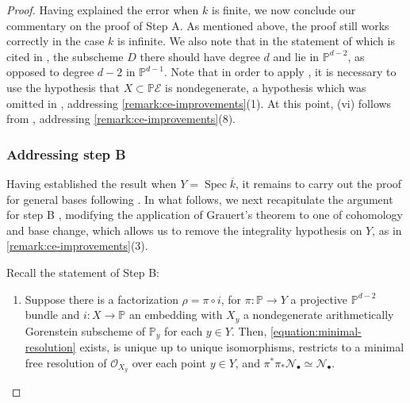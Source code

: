 \documentclass[12 pt]{amsart}
\theoremstyle{plain}
\theoremstyle{definition}
\theoremstyle{remark}
\numberwithin{equation}{section}
\newcommand\bp{\mathbb P}
\newcommand\sce{\mathscr E}
\newcommand\scn{\mathscr N}
\newcommand\sco{\mathscr O}
\newcommand \ra{\rightarrow}
\DeclareMathOperator\spec{\operatorname{Spec}}
\begin{document}
\begin{proof}
	Having explained the error when $k$ is finite, we now conclude our
	commentary on the proof of Step A.
	As mentioned above, the proof still works correctly in the case $k$ is
	infinite.
	We also note
	that in the statement of \cite[Lem., p. 119]{schreyer1986syzygies} which
	is cited in \cite[Step A, p. 443]{casnatiE:covers-algebraic-varieties},
	the subscheme $D$ there should have degree $d$ and lie in $\bp^{d-2}$,
	as opposed to degree $d-2$ in $\bp^{d-1}$.  
	Note that in order to apply \cite[Lem., p. 119]{schreyer1986syzygies},
	it is necessary to use the
	hypothesis that $X \subset \bp\sce$ is nondegenerate, a hypothesis
	which was omitted in \cite[Thm.\
	2.1]{casnatiE:covers-algebraic-varieties}, addressing
	\autoref{remark:ce-improvements}(1).
	At this point, (vi) follows from 
	\cite[Lem., p. 119]{schreyer1986syzygies}, addressing
	\autoref{remark:ce-improvements}(8).


\subsubsection*{Addressing step B}
	Having established the result when $Y = \spec \overline{k}$, 
	it remains to carry out the proof for general bases following \cite[Step B, C,
	and D, p. 445-447]{casnatiE:covers-algebraic-varieties}.
	In what follows, we next recapitulate the argument for step B \cite[p.
	445]{casnatiE:covers-algebraic-varieties}, modifying the application of
	Grauert's theorem to one of cohomology and base change, which allows us
	to remove the integrality hypothesis on $Y$, as in
	\autoref{remark:ce-improvements}(3).

	Recall the statement of Step B: 
\begin{enumerate}
\item[Step B:] Suppose there is a factorization $\rho =
	\pi \circ i$, for $\pi: \bp \ra Y$ a projective $\bp^{d-2}$ bundle and
	$i: X \ra \bp$ an embedding with $X_y$ a nondegenerate arithmetically Gorenstein
	subscheme of $\bp_y$ for each $y \in Y$.  Then,
	\eqref{equation:minimal-resolution} exists, is unique up to unique
	isomorphisms,  
	restricts to a minimal free resolution of $\sco_{X_y}$ over each point
	$y \in Y$,
	and $\pi^* \pi_* \scn_\bullet \simeq \scn_\bullet$.
\end{enumerate}


\end{proof}
\end{document}
